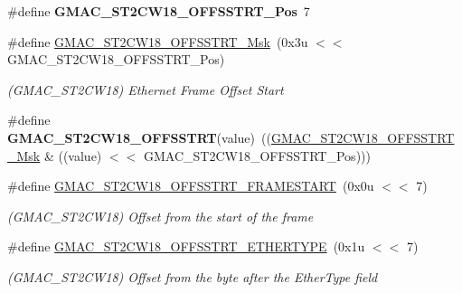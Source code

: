 \begin{DoxyCompactItemize}
\item 
\mbox{\label{group__SAMV71__GMAC_ga1246ed3e88b926bd90dc08eae286f87d}} 
\#define {\bfseries G\+M\+A\+C\+\_\+\+S\+T2\+C\+W18\+\_\+\+O\+F\+F\+S\+S\+T\+R\+T\+\_\+\+Pos}~7
\item 
\mbox{\label{group__SAMV71__GMAC_ga40187676eaa690fe2922327ed07602eb}} 
\#define \mbox{\hyperlink{group__SAMV71__GMAC_ga40187676eaa690fe2922327ed07602eb}{G\+M\+A\+C\+\_\+\+S\+T2\+C\+W18\+\_\+\+O\+F\+F\+S\+S\+T\+R\+T\+\_\+\+Msk}}~(0x3u $<$$<$ G\+M\+A\+C\+\_\+\+S\+T2\+C\+W18\+\_\+\+O\+F\+F\+S\+S\+T\+R\+T\+\_\+\+Pos)
\begin{DoxyCompactList}\small\item\em (G\+M\+A\+C\+\_\+\+S\+T2\+C\+W18) Ethernet Frame Offset Start \end{DoxyCompactList}\item 
\mbox{\label{group__SAMV71__GMAC_ga62780301515bccf642beae347c0b86fb}} 
\#define {\bfseries G\+M\+A\+C\+\_\+\+S\+T2\+C\+W18\+\_\+\+O\+F\+F\+S\+S\+T\+RT}(value)~((\mbox{\hyperlink{group__SAMV71__GMAC_ga40187676eaa690fe2922327ed07602eb}{G\+M\+A\+C\+\_\+\+S\+T2\+C\+W18\+\_\+\+O\+F\+F\+S\+S\+T\+R\+T\+\_\+\+Msk}} \& ((value) $<$$<$ G\+M\+A\+C\+\_\+\+S\+T2\+C\+W18\+\_\+\+O\+F\+F\+S\+S\+T\+R\+T\+\_\+\+Pos)))
\item 
\mbox{\label{group__SAMV71__GMAC_gaee334d28e3ad0cec00ba2a9e506051cd}} 
\#define \mbox{\hyperlink{group__SAMV71__GMAC_gaee334d28e3ad0cec00ba2a9e506051cd}{G\+M\+A\+C\+\_\+\+S\+T2\+C\+W18\+\_\+\+O\+F\+F\+S\+S\+T\+R\+T\+\_\+\+F\+R\+A\+M\+E\+S\+T\+A\+RT}}~(0x0u $<$$<$ 7)
\begin{DoxyCompactList}\small\item\em (G\+M\+A\+C\+\_\+\+S\+T2\+C\+W18) Offset from the start of the frame \end{DoxyCompactList}\item 
\mbox{\label{group__SAMV71__GMAC_gaf1bf614eef0150068fe30214f05c545e}} 
\#define \mbox{\hyperlink{group__SAMV71__GMAC_gaf1bf614eef0150068fe30214f05c545e}{G\+M\+A\+C\+\_\+\+S\+T2\+C\+W18\+\_\+\+O\+F\+F\+S\+S\+T\+R\+T\+\_\+\+E\+T\+H\+E\+R\+T\+Y\+PE}}~(0x1u $<$$<$ 7)
\begin{DoxyCompactList}\small\item\em (G\+M\+A\+C\+\_\+\+S\+T2\+C\+W18) Offset from the byte after the Ether\+Type field \end{DoxyCompactList}\item 

\end{DoxyCompactItemize}
